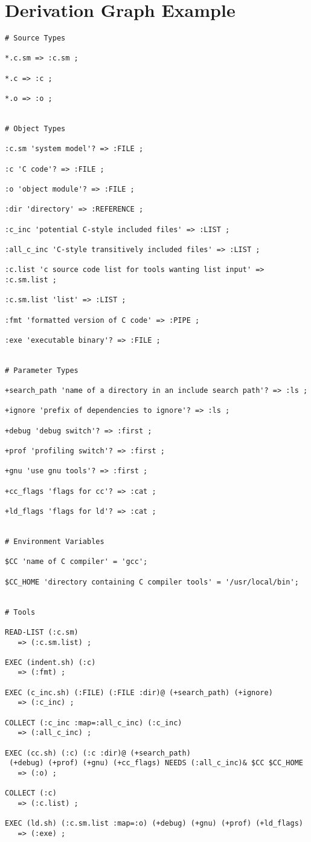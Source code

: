 \chapter{Derivation Graph Example}

\begin{verbatim}
# Source Types

*.c.sm => :c.sm ;

*.c => :c ;

*.o => :o ;


# Object Types

:c.sm 'system model'? => :FILE ;

:c 'C code'? => :FILE ;

:o 'object module'? => :FILE ;

:dir 'directory' => :REFERENCE ;

:c_inc 'potential C-style included files' => :LIST ;

:all_c_inc 'C-style transitively included files' => :LIST ;

:c.list 'c source code list for tools wanting list input' => :c.sm.list ;

:c.sm.list 'list' => :LIST ;

:fmt 'formatted version of C code' => :PIPE ;

:exe 'executable binary'? => :FILE ;


# Parameter Types

+search_path 'name of a directory in an include search path'? => :ls ;

+ignore 'prefix of dependencies to ignore'? => :ls ;

+debug 'debug switch'? => :first ;

+prof 'profiling switch'? => :first ;

+gnu 'use gnu tools'? => :first ;

+cc_flags 'flags for cc'? => :cat ;

+ld_flags 'flags for ld'? => :cat ;


# Environment Variables

$CC 'name of C compiler' = 'gcc';

$CC_HOME 'directory containing C compiler tools' = '/usr/local/bin';


# Tools

READ-LIST (:c.sm)
   => (:c.sm.list) ;

EXEC (indent.sh) (:c)
   => (:fmt) ;
 
EXEC (c_inc.sh) (:FILE) (:FILE :dir)@ (+search_path) (+ignore)
   => (:c_inc) ;

COLLECT (:c_inc :map=:all_c_inc) (:c_inc)
   => (:all_c_inc) ;

EXEC (cc.sh) (:c) (:c :dir)@ (+search_path)
 (+debug) (+prof) (+gnu) (+cc_flags) NEEDS (:all_c_inc)& $CC $CC_HOME
   => (:o) ;

COLLECT (:c)
   => (:c.list) ;

EXEC (ld.sh) (:c.sm.list :map=:o) (+debug) (+gnu) (+prof) (+ld_flags)
   => (:exe) ;
\end{verbatim}

